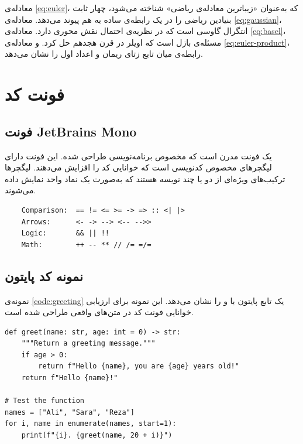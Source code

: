 \documentclass{matinbook}
\begin{document}
معادله‌ی \cref{eq:euler}، که به‌عنوان «زیباترین معادله‌ی ریاضی»
شناخته می‌شود، چهار ثابت بنیادین ریاضی را در یک رابطه‌ی ساده
به هم پیوند می‌دهد. معادله‌ی \cref{eq:gaussian}، انتگرال گاوسی
است که در نظریه‌ی احتمال نقش محوری دارد. معادله‌ی
\cref{eq:basel}، مسئله‌ی بازل است که اویلر در قرن هجدهم حل کرد.
و معادله‌ی \cref{eq:euler-product}، رابطه‌ی میان تابع زتای
ریمان و اعداد اول را نشان می‌دهد.

\chapter{فونت کد}
\label{chap:font-code}

\section{فونت JetBrains Mono}
\label{sec:font-code-jetbrains}

 یک فونت  مدرن است که مخصوص
برنامه‌نویسی طراحی شده. این فونت دارای لیگچرهای مخصوص کدنویسی
است که خوانایی کد را افزایش می‌دهند. لیگچرها ترکیب‌های ویژه‌ای
از دو یا چند نویسه هستند که به‌صورت یک نماد واحد نمایش داده
می‌شوند.

\begin{latin}
\begin{verbatim}
    Comparison:  == != <= >= -> => :: <| |>
    Arrows:      <- -> --> <-- -->>
    Logic:       && || !!
    Math:        ++ -- ** // /= =/=
\end{verbatim}
\end{latin}

\section{نمونه کد پایتون}
\label{sec:font-code-python}

نمونه‌ی \cref{code:greeting} یک تابع پایتون با 
و  را نشان می‌دهد. این نمونه برای ارزیابی
خوانایی فونت کد در متن‌های واقعی طراحی شده است.

\begin{latin}
\begin{verbatim}
def greet(name: str, age: int = 0) -> str:
    """Return a greeting message."""
    if age > 0:
        return f"Hello {name}, you are {age} years old!"
    return f"Hello {name}!"

# Test the function
names = ["Ali", "Sara", "Reza"]
for i, name in enumerate(names, start=1):
    print(f"{i}. {greet(name, 20 + i)}")
\end{verbatim}
\end{latin}
\label{code:greeting}
\end{document}
